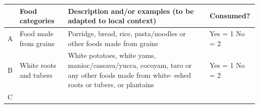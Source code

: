 \documentclass[12pt,]{book}
\theoremstyle{definition}
\theoremstyle{definition}
\theoremstyle{definition}
\theoremstyle{remark}
\begin{document}
\begin{longtable}[]{@{}clll@{}}
\toprule
\begin{minipage}[b]{0.05\columnwidth}\centering
\strut
\end{minipage} & \begin{minipage}[b]{0.18\columnwidth}\raggedright
\textbf{Food categories}\strut
\end{minipage} & \begin{minipage}[b]{0.54\columnwidth}\raggedright
\textbf{Description and/or examples (to be adapted to local
context)}\strut
\end{minipage} & \begin{minipage}[b]{0.12\columnwidth}\raggedright
\textbf{Consumed?}\strut
\end{minipage}\tabularnewline
\midrule
\endhead
\begin{minipage}[t]{0.05\columnwidth}\centering
A\strut
\end{minipage} & \begin{minipage}[t]{0.18\columnwidth}\raggedright
Food made from grains\strut
\end{minipage} & \begin{minipage}[t]{0.54\columnwidth}\raggedright
Porridge, bread, rice, pasta/noodles or other foods made from
grains\strut
\end{minipage} & \begin{minipage}[t]{0.12\columnwidth}\raggedright
Yes = 1 No = 2\strut
\end{minipage}\tabularnewline
\begin{minipage}[t]{0.05\columnwidth}\centering
B\strut
\end{minipage} & \begin{minipage}[t]{0.18\columnwidth}\raggedright
White roots and tubers\strut
\end{minipage} & \begin{minipage}[t]{0.54\columnwidth}\raggedright
White potatoes, white yams, manioc/cassava/yucca, cocoyam, taro or any
other foods made from white- eshed roots or tubers, or plantains\strut
\end{minipage} & \begin{minipage}[t]{0.12\columnwidth}\raggedright
Yes = 1 No = 2\strut
\end{minipage}\tabularnewline
\begin{minipage}[t]{0.05\columnwidth}\centering
C\strut
\end{minipage} & \begin{minipage}[t]{0.18\columnwidth}\raggedright

\end{minipage}
\end{longtable}
\end{document}
